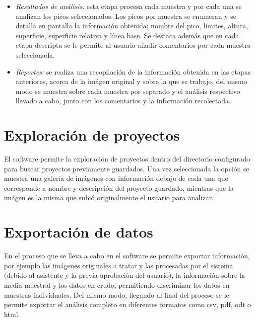 \begin{itemize}
	\item \textit{Resultados de an\'alisis:} esta etapa procesa cada muestra y por cada una se analizan los picos seleccionados. Los picos por muestra se enumeran y se detalla en pantalla la informaci\'on obtenida: nombre del pico, l\'imites, altura, superficie, superficie relativa y l\'inea base. Se destaca adem\'as que en cada etapa descripta se le permite al usuario a\~nadir comentarios por cada muestra seleccionada.
	\item \textit{Reportes:} se realiza una recopilaci\'on de la informaci\'on obtenida en las etapas anteriores, acerca de la im\'agen original y sobre la que se trabajo, del mismo modo se muestra sobre cada muestra por separado y el an\'alisis respectivo llevado a cabo, junto con los comentarios y la informaci\'on recolectada.
\end{itemize}
\section{Exploraci\'on de proyectos}
El software permite la exploraci\'on de proyectos dentro del directorio configurado para buscar proyectos previamente guardados. Una vez seleccionada la opci\'on se muestra una galer\'ia de im\'agenes con informaci\'on debajo de cada una que corresponde a nombre y descripci\'on del proyecto guardado, mientras que la im\'agen es la misma que subi\'o originalmente el usuario para analizar.

\section{Exportaci\'on de datos}
En el proceso que se lleva a cabo en el software se permite exportar informaci\'on, por ejemplo las im\'agenes originales a tratar y las procesadas por el sistema (debido al asistente y la previa aprobaci\'on del usuario), la informaci\'on sobre la media muestral y los datos en crudo, permitiendo discriminar los datos en muestras individuales. Del mismo modo, llegando al final del proceso se le permite exportar el an\'alisis completo en diferentes formatos como csv, pdf, odt o html.

